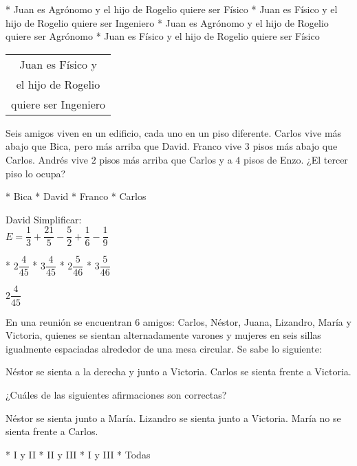 \begin{enum}
	* Juan es Agr\'onomo y el hijo de Rogelio quiere ser F\'isico
	* Juan es F\'isico y el hijo de Rogelio quiere ser Ingeniero
	* Juan es Agr\'onomo y el hijo de Rogelio quiere ser Agr\'onomo
	* Juan es F\'isico y el hijo de Rogelio quiere ser F\'isico
\end{enum}
\begin{tabular}{c}
	Juan es F\'isico y \\
	el hijo de Rogelio \\
	quiere ser Ingeniero
\end{tabular}
\begin{mini}[.7]
	Seis amigos viven en un edificio, cada uno en un piso diferente. Carlos vive m\'as abajo que Bica, pero m\'as arriba que David. Franco vive $3$ pisos m\'as abajo que Carlos. Andr\'es vive $2$ pisos m\'as arriba que Carlos y a $4$ pisos de Enzo. ¿El tercer piso lo ocupa?
\end{mini}
\begin{task}
	* Bica
	* David
	* Franco
	* Carlos
\end{task}
David
Simplificar: \vspace{5pt} \\
$E=\dfrac{1}{3}+\dfrac{21}{5}-\dfrac{5}{2}+\dfrac{1}{6}-\dfrac{1}{9}$
\begin{task}
	* $2\dfrac{4}{45}$
	* $3\dfrac{4}{45}$
	* $2\dfrac{5}{46}$
	* $3\dfrac{5}{46}$
\end{task}
$2\dfrac{4}{45}$
\begin{mini}[.9]
	En una reuni\'on se encuentran $6$ amigos: Carlos, N\'estor, Juana, Lizandro, Mar\'ia y Victoria, quienes se sientan alternadamente varones y mujeres en seis sillas igualmente espaciadas alrededor de una mesa circular. Se sabe lo siguiente:
	\begin{itemize}
		\ii N\'estor se sienta a la derecha y junto a Victoria.
		\ii Carlos se sienta frente a Victoria.
	\end{itemize}
	¿Cu\'ales de las siguientes afirmaciones son correctas?
	\begin{enumerate}[label=\Roman*)]
		\ii N\'estor se sienta junto a Mar\'ia.
		\ii Lizandro se sienta junto a Victoria.
		\ii Mar\'ia no se sienta frente a Carlos.
	\end{enumerate}
\end{mini}
\begin{task}
	* I y II
	* II y III
	* I y III
	* Todas
\end{task}
